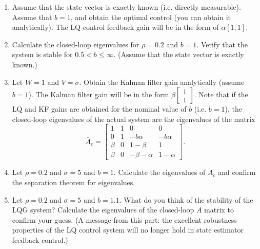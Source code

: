 \documentclass{article}
\begin{document}
\begin{enumerate}
\item Assume that the state vector is exactly known (i.e. directly measurable). Assume that $b = 1$, and obtain the optimal control (you can obtain it analytically). The LQ control feedback gain will be in the form of $\alpha[1, 1]$.
\item Calculate the closed-loop eigenvalues for $\rho = 0.2$ and $b = 1$. Verify that the system is stable for $0.5 < b \le \infty$. (Assume that the state vector is exactly known.)
\item Let $W = 1$ and $V = \sigma$. Obtain the Kalman filter gain analytically (assume $b = 1$). The Kalman filter gain will be in the form $\beta\begin{bmatrix} 1 \\ 1 \end{bmatrix}$. Note that if the LQ and KF gains are obtained for the nominal value of $b$ (i.e. $b = 1$), the closed-loop eigenvalues of the actual system are the eigenvalues of the matrix
\[
\bar{A}_c = \begin{bmatrix}
1 & 1 & 0 & 0 \\
0 & 1 & -b\alpha & -b\alpha \\
\beta & 0 & 1 - \beta & 1 \\
\beta & 0 & -\beta - \alpha & 1 - \alpha
\end{bmatrix}.
\]
\item Let $\rho = 0.2$ and $\sigma = 5$ and $b = 1$. Calculate the eigenvalues of $\bar{A}_c$ and confirm the separation theorem for eigenvalues.
\item Let $\rho = 0.2$ and $\sigma = 5$ and $b = 1.1$. What do you think of the stability of the LQG system? Calculate the eigenvalues of the closed-loop $A$ matrix to confirm your guess. (A message from this part: the excellent robustness properties of the LQ control system will no longer hold in state estimator feedback control.)
\end{enumerate}
\end{document}

